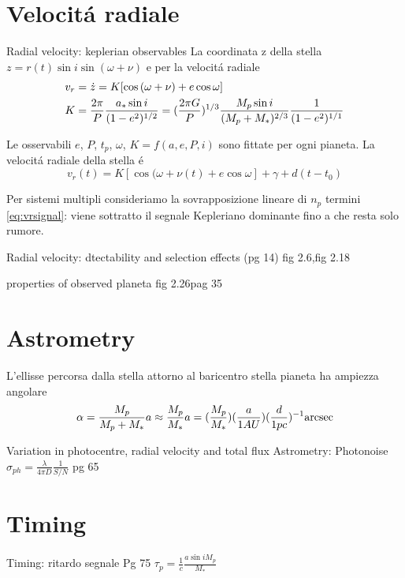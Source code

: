 \section{Velocit\'a radiale}
\begin{workout}{Radial velocity: keplerian observables}
La coordinata z della stella $z=r(t)\sin{i}\sin{(\omega+\nu)}$ e per la velocit\'a radiale
\begin{align}
&v_r=\dot{z}=K[\cos{(\omega+\nu)}+e\cos{\omega}]\label{eq:vrsignal}\\
&K=\frac{2\pi}{P}\frac{a_*\sin{i}}{(1-e^2)\expy{1/2}}=(\frac{2\pi G}{P})\expy{1/3}\frac{M_p\sin{i}}{(M_p+M_*)\expy{2/3}}\frac{1}{(1-e^2)\expy{1/1}}
\end{align}

Le osservabili $e$, $P$, $t_p$, $\omega$, $K=f(a,e,P,i)$ sono fittate per ogni pianeta.
La velocit\'a radiale della stella \'e
\begin{equation}
v_r(t)=K[\cos{(\omega+\nu(t)}+e\cos{\omega}]+\gamma+d(t-t_0)
\end{equation}
\end{workout}
Per sistemi multipli consideriamo la sovrapposizione lineare di $n_p$ termini \eqref{eq:vrsignal}: viene sottratto il segnale Kepleriano dominante fino a che resta solo rumore.
\begin{workout}{Radial velocity: dtectability and selection effects (pg 14)}
fig 2.6,fig 2.18
\end{workout}
\begin{workout}{properties of observed planeta}
fig 2.26pag 35
\end{workout}
\section{Astrometry}
L'ellisse percorsa dalla stella attorno al baricentro stella pianeta ha ampiezza angolare
\begin{equation}
\alpha=\frac{M_p}{M_p+M_*}a\approx\frac{M_p}{M_*}a=(\frac{M_p}{M_*})(\frac{a}{1AU})(\frac{d}{1pc})\expy{-1}\si{\arcsec}
\end{equation}

\begin{workout}{Variation in photocentre, radial velocity and total flux}
Astrometry: Photonoise $\sigma_{ph}=\frac{\lambda}{4\pi D}\frac{1}{S/N}$
pg 65
\end{workout}

\section{Timing}
\begin{workout}{Timing: ritardo segnale}
Pg 75
$\tau_p=\frac{1}{c}\frac{a\sin{i}M_p}{M_*}$
\end{workout}
